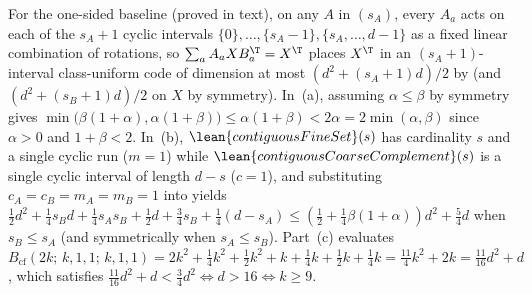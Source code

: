 \begin{outline}
For the one-sided baseline (proved in text), on any $A$ in $(s_A)$,
every $A_a$ acts on each of the $s_A + 1$ cyclic intervals $\{0\}, \dots, \{s_A - 1\},
\{s_A, \dots, d - 1\}$ as a fixed linear combination of rotations, so $\sum_a A_a X B_a^{\T} = X^{\T}$
places $X^{\T}$ in an $(s_A + 1)$-interval class-uniform code of dimension at most
$(d^2 + (s_A + 1)d)/2$ by \cite[Theorem~6.4]{SeventeenthPaper2026} (and $(d^2 + (s_B + 1)d)/2$ on
$X$ by symmetry). In~(a), assuming $\alpha \le \beta$ by symmetry gives
$\min\bigl(\beta(1+\alpha), \alpha(1+\beta)\bigr) \le \alpha(1+\beta) < 2\alpha = 2\min(\alpha,\beta)$
since $\alpha > 0$ and $1 + \beta < 2$. In~(b), $\lean{contiguousFineSet}(s)$ has cardinality $s$ and
a single cyclic run ($m = 1$) while $\lean{contiguousCoarseComplement}(s)$ is a single cyclic interval
of length $d - s$ ($c = 1$), and substituting $c_A = c_B = m_A = m_B = 1$ into
 yields
$\frac{1}{2}d^2 + \frac{1}{4}s_B d + \frac{1}{4}s_A s_B + \frac{1}{2}d + \frac{3}{4}s_B +
\frac{1}{4}(d - s_A) \le (\frac{1}{2} + \frac{1}{4}\beta(1+\alpha))d^2 + \frac{5}{4}d$ when
$s_B \le s_A$ (and symmetrically when $s_A \le s_B$). Part~(c) evaluates
$B_{\mathrm{cf}}(2k;\, k,1,1;\, k,1,1) = 2k^2 + \frac{1}{4}k^2 + \frac{1}{2}k^2 + k + \frac{1}{4}k +
\frac{1}{2}k + \frac{1}{4}k = \frac{11}{4}k^2 + 2k = \frac{11}{16}d^2 + d$, which satisfies
$\frac{11}{16}d^2 + d < \frac{3}{4}d^2 \iff d > 16 \iff k \ge 9$.
\end{outline}

